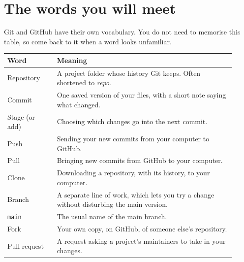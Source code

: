 \section{The words you will meet}

Git and GitHub have their own vocabulary. You do not need to memorise this table, so come back to it when a word looks unfamiliar.

\begin{longtable}{p{0.2\linewidth}p{0.72\linewidth}}
\toprule
Word & Meaning \\
\midrule
Repository & A project folder whose history Git keeps. Often shortened to \emph{repo}. \\
Commit & One saved version of your files, with a short note saying what changed. \\
Stage (or add) & Choosing which changes go into the next commit. \\
Push & Sending your new commits from your computer to GitHub. \\
Pull & Bringing new commits from GitHub to your computer. \\
Clone & Downloading a repository, with its history, to your computer. \\
Branch & A separate line of work, which lets you try a change without disturbing the main version. \\
\texttt{main} & The usual name of the main branch. \\
Fork & Your own copy, on GitHub, of someone else's repository. \\
Pull request & A request asking a project's maintainers to take in your changes. \\
\bottomrule
\end{longtable}
